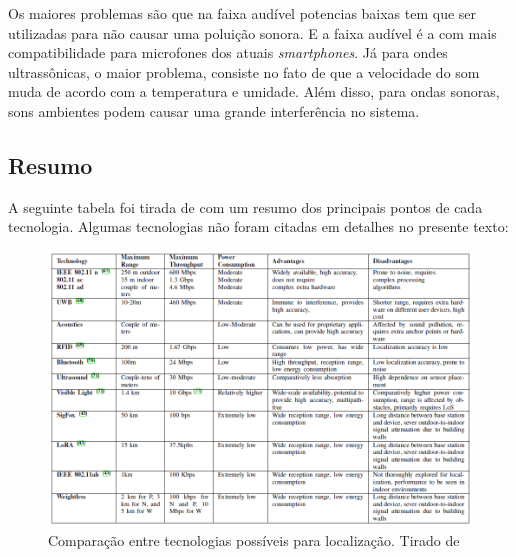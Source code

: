 Os maiores problemas são que na faixa audível potencias baixas tem que ser utilizadas para não causar uma poluição sonora. E a faixa audível é a com mais compatibilidade para microfones dos atuais \textit{smartphones}. Já para ondes ultrassônicas, o maior problema, consiste no fato de que a velocidade do som muda de acordo com a temperatura e umidade. Além disso, para ondas sonoras, sons ambientes podem causar uma grande interferência no sistema.


\subsection{Resumo}
A seguinte tabela foi tirada de \cite{art2} com um resumo dos principais pontos de cada tecnologia. Algumas tecnologias não foram citadas em detalhes no presente texto:

\begin{figure}[H]
	\centering 
	\includegraphics[scale = 0.7]{images/technologies_table.png}
	\caption{Comparação entre tecnologias possíveis para localização. Tirado de \cite{art2}}
	\label{fig:technologies_table.png}
\end{figure}
